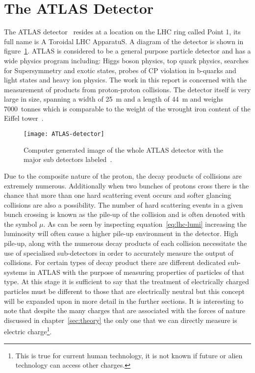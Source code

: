 \section{The ATLAS Detector}%
\label{sec:atlas}

The ATLAS detector~\cite{ATLAS} resides at a location on the LHC ring called
Point 1, its full name is A Toroidal LHC ApparatuS. A diagram of the detector is
shown in figure~\ref{fig:ATLAS-det}. ATLAS is considered to be a general purpose
particle detector and has a wide physics program including: Higgs boson physics,
top quark physics, searches for Supersymmetry and exotic states, probes of CP
violation in b-quarks and light states and heavy ion physics. The work in this
report is concerned with the measurement of products from proton-proton
collisions. The detector itself is very large in size, spanning a width of 25~m
and a length of 44~m and weighs 7000~tonnes which is comparable to the weight of
the wrought iron content of the Eiffel tower~\cite{Eiffel-weight}.
\begin{figure}[h]
  \centering
  \texttt{[image: ATLAS-detector]}
  \caption[The ATLAS Detector]{Computer generated image of the whole ATLAS
    detector with the major sub detectors labeled~\cite{ATLAS-det-fig}.}%
  \label{fig:ATLAS-det}
\end{figure}


Due to the composite nature of the proton, the decay products of collisions are
extremely numerous. Additionally when two bunches of protons cross there is the
chance that more than one hard scattering event occurs and softer glancing
collisions are also a possibility. The number of hard scattering events in a
given bunch crossing is known as the pile-up of the collision and is often
denoted with the symbol $\mu$. As can be seen by inspecting
equation~\ref{eq:lhc-lumi} increasing the luminosity will often cause a higher
pile-up environment in the detector. High pile-up, along with the numerous decay
products of each collision necessitate the use of specialised sub-detectors in
order to accurately measure the output of collisions. For certain types of
decay product there are different dedicated sub-systems in ATLAS with the
purpose of measuring properties of particles of that type. At this stage it is
sufficient to say that the treatment of electrically charged particles must be
different to those that are electrically neutral but this concept will be
expanded upon in more detail in the further sections. It is interesting to note
that despite the many charges that are associated with the forces of nature
discussed in chapter~\ref{sec:theory} the only one that we can directly measure
is electric charge\footnote{This is true for current human technology, it is not
  known if future or alien technology can access other charges.}.

